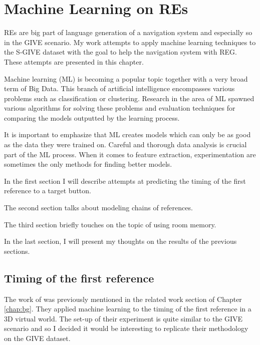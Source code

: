 \chapter{Machine Learning on REs}
\label{chap:ml}
REs are big part of language generation of a navigation system and especially so in the GIVE scenario. My work attempts to apply machine learning techniques to the S-GIVE dataset with the goal to help the navigation system with REG. These attempts are presented in this chapter.

Machine learning (ML) is becoming a popular topic together with a very broad term of Big Data. This branch of artificial intelligence encompasses various problems such as classification or clustering. Research in the area of ML spawned various algorithms for solving these problems and evaluation techniques for comparing the models outputted by the learning process. 

It is important to emphasize that ML creates models which can only be as good as the data they were trained on. Careful and thorough data analysis is crucial part of the ML process. When it comes to feature extraction, experimentation are sometimes the only methods for finding better models. 

In the first section I will describe attempts at predicting the timing of the first reference to a target button. 

The second section talks about modeling chains of references. 

The third section briefly touches on the topic of using room memory. 

In the last section, I will present my thoughts on the results of the previous sections.

\section{Timing of the first reference}
\label{sec:timing-firsref-ml}
The work of \citet{stoia2006sentence} was previously mentioned in the related work section of Chapter \ref{chap:bg}. They applied machine learning to the timing of the first reference in a 3D virtual world. The set-up of their experiment is quite similar to the GIVE scenario and so I decided it would be interesting to replicate their methodology on the GIVE dataset. 

